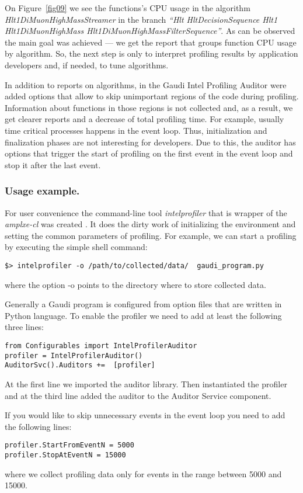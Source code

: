 On Figure~\ref{fig09} we see the functions's CPU usage  in the algorithm {\it Hlt1DiMuonHighMassStreamer} in the branch 
{\it ``Hlt HltDecisionSequence Hlt1 Hlt1DiMuonHighMass Hlt1DiMuonHighMassFilterSequence''}. 
As can be observed the main goal was achieved --- we get the report that groups function CPU usage by algorithm.
So, the next step is only to interpret profiling results by application developers and, if needed, to tune algorithms.

In addition to reports on algorithms, in the Gaudi Intel Profiling Auditor were
added options that allow to skip unimportant regions of the code during
profiling. Information about functions in those regions is not collected and,
as a result, we get clearer reports and a decrease of total profiling time. For
example, usually time critical processes happens in the event loop. Thus,
initialization and finalization phases are not interesting for developers. Due
to this, the auditor has options that trigger the start of  profiling on the
first event in the event loop and stop it after the last event.

\subsubsection{Usage example.}

For user convenience the command-line tool {\it intelprofiler} that is wrapper of the {\it amplxe-cl} was created . 
It does the dirty work of initializing the environment and setting the common parameters of profiling. 
For example, we can start a profiling by executing the simple shell command:
\begin{verbatim}
$> intelprofiler -o /path/to/collected/data/  gaudi_program.py
\end{verbatim}
where the option -o points to the directory where to store collected data.

Generally a Gaudi program is configured from option files that are written in
Python language. To enable the profiler we need to add at least the following
three lines:
\begin{verbatim}
from Configurables import IntelProfilerAuditor
profiler = IntelProfilerAuditor()
AuditorSvc().Auditors +=  [profiler]
\end{verbatim}

At the first line we imported the auditor library. Then instantiated the
profiler and at the third line added the auditor to the Auditor Service
component.

If you would like to skip unnecessary events in the event loop you need to add the following lines:
\begin{verbatim}
profiler.StartFromEventN = 5000 
profiler.StopAtEventN = 15000
\end{verbatim}
where we collect profiling data only for events in the range between 5000 and 15000.

